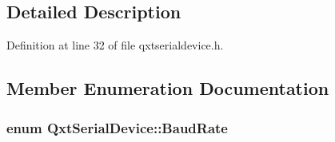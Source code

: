 \subsection{Detailed Description}


Definition at line 32 of file qxtserialdevice.\-h.



\subsection{Member Enumeration Documentation}
\hypertarget{class_qxt_serial_device_ad433242c52b779e5c88e10a456070ddc}{
\subsubsection[{Baud\-Rate}]{\setlength{\rightskip}{0pt plus 5cm}enum {\bf Qxt\-Serial\-Device\-::\-Baud\-Rate}}}\label{class_qxt_serial_device_ad433242c52b779e5c88e10a456070ddc}
